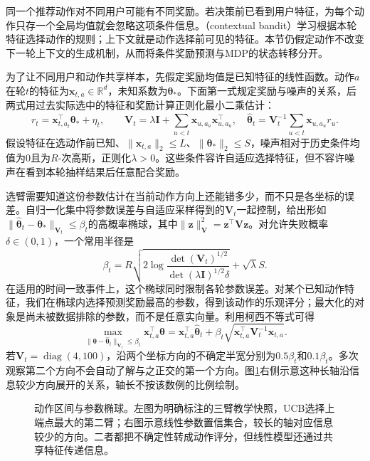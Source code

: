 同一个推荐动作对不同用户可能有不同奖励。若决策前已看到用户特征，为每个动作只存一个全局均值就会忽略这项条件信息。（contextual bandit）学习根据本轮特征选择动作的规则；上下文就是动作选择前可见的特征。本节仍假定动作不改变下一轮上下文的生成机制，从而将条件奖励预测与MDP的状态转移分开。

为了让不同用户和动作共享样本，先假定奖励均值是已知特征的线性函数。动作$a$在轮$t$的特征为$\bm{x}_{t,a}\in\mathbb R^d$，未知系数为$\bm\theta_*$。下面第一式规定奖励与噪声的关系，后两式用过去实际选中的特征和奖励计算正则化最小二乘估计：
\begin{equation}
  r_t=\bm{x}_{t,a_t}^{\top}\bm{\theta}_*+\eta_t,\qquad
  \bm{V}_t=\lambda\bm{I}+\sum_{u<t}\bm{x}_{u,a_u}\bm{x}_{u,a_u}^{\top},
  \quad
  \widehat{\bm{\theta}}_t
  =\bm{V}_t^{-1}\sum_{u<t}\bm{x}_{u,a_u}r_u .
  \label{eq:rl-learning-linear-bandit}
\end{equation}
假设特征在选动作前已知、$\lVert\bm{x}_{t,a}\rVert_2\leq L$、$\lVert\bm{\theta}_*\rVert_2\leq S$，噪声相对于历史条件均值为0且为$R$-次高斯，正则化$\lambda>0$。这些条件容许自适应选择特征，但不容许噪声在看到本轮抽样结果后任意配合奖励。

选臂需要知道这份参数估计在当前动作方向上还能错多少，而不只是各坐标的误差。自归一化集中将参数误差与自适应采样得到的$\bm V_t$一起控制，给出形如$\lVert\widehat{\bm{\theta}}_t-\bm{\theta}_*\rVert_{\bm{V}_t}\leq\beta_t$的高概率椭球，其中$\lVert\bm{z}\rVert_{\bm{V}}^2=\bm{z}^{\top}\bm{V}\bm{z}$。对允许失败概率$\delta\in(0,1)$，一个常用半径是
\[
  \beta_t=R\sqrt{2\log
       \frac{\det(\bm{V}_t)^{1/2}}
            {\det(\lambda\bm{I})^{1/2}\delta}}
       +\sqrt{\lambda}S .
\]
在适用的时间一致事件上，这个椭球同时限制各轮参数误差。对某个已知动作特征，我们在椭球内选择预测奖励最高的参数，得到该动作的乐观评分；最大化的对象是尚未被数据排除的参数，而不是任意实向量。利用柯西不等式可得
\[
  \max_{\lVert\bm{\theta}-\widehat{\bm{\theta}}_t\rVert_{\bm{V}_t}\leq\beta_t}
  \bm{x}_{t,a}^{\top}\bm{\theta}
  =
  \bm{x}_{t,a}^{\top}\widehat{\bm{\theta}}_t
  +\beta_t\sqrt{\bm{x}_{t,a}^{\top}\bm{V}_t^{-1}\bm{x}_{t,a}}.
\]
若$\bm{V}_t=\operatorname{diag}(4,100)$，沿两个坐标方向的不确定半宽分别为$0.5\beta_t$和$0.1\beta_t$。多次观察第二个方向不会自动了解与之正交的第一个方向。图\ref{fig:rl-learning-bandit-geometry}右侧示意这种长轴沿信息较少方向展开的关系，轴长不按该数例的比例绘制。

\begin{figure}[t]
  \centering
  
  \caption{动作区间与参数椭球。左图为明确标注的三臂教学快照，UCB选择上端点最大的第二臂；右图示意线性参数置信集合，较长的轴对应信息较少的方向。二者都把不确定性转成动作评分，但线性模型还通过共享特征传递信息。}
  \label{fig:rl-learning-bandit-geometry}
\end{figure}

